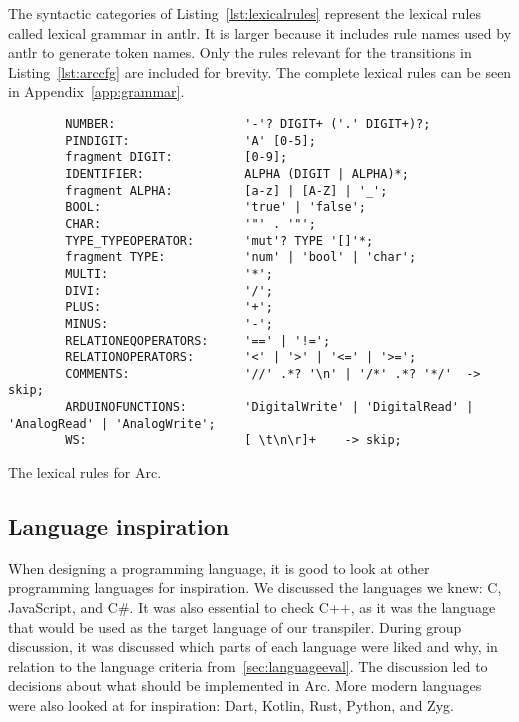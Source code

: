 The syntactic categories of Listing~\ref{lst:lexicalrules} represent the lexical rules called lexical grammar in \gls{antlr}. It is larger because it includes rule names used by \gls{antlr} to generate token names. Only the rules relevant for the transitions in Listing~\ref{lst:arccfg} are included for brevity. The complete lexical rules can be seen in Appendix~\ref{app:grammar}.


\begin{listing}[htb!]
    \begin{verbatim}
        NUMBER:                  '-'? DIGIT+ ('.' DIGIT+)?;
        PINDIGIT:                'A' [0-5];
        fragment DIGIT:          [0-9];
        IDENTIFIER:              ALPHA (DIGIT | ALPHA)*;
        fragment ALPHA:          [a-z] | [A-Z] | '_';
        BOOL:                    'true' | 'false';
        CHAR:                    '"' . '"';
        TYPE_TYPEOPERATOR:       'mut'? TYPE '[]'*;
        fragment TYPE:           'num' | 'bool' | 'char';
        MULTI:                   '*';
        DIVI:                    '/';
        PLUS:                    '+';
        MINUS:                   '-';
        RELATIONEQOPERATORS:     '==' | '!=';
        RELATIONOPERATORS:       '<' | '>' | '<=' | '>=';
        COMMENTS:                '//' .*? '\n' | '/*' .*? '*/'  -> skip;
        ARDUINOFUNCTIONS:        'DigitalWrite' | 'DigitalRead' | 'AnalogRead' | 'AnalogWrite';
        WS:                      [ \t\n\r]+    -> skip;
    \end{verbatim}
    \caption{The lexical rules for Arc.}
    \label{lst:lexicalrules}
\end{listing}


\subsection{Language inspiration}\label{sec:inspiration}
When designing a programming language, it is good to look at other programming languages for inspiration. We discussed the languages we knew: C, JavaScript, and C\#. It was also essential to check C++, as it was the language that would be used as the target language of our transpiler. During group discussion, it was discussed which parts of each language were liked and why, in relation to the language criteria from~\ref{sec:languageeval}. The discussion led to decisions about what should be implemented in Arc. More modern languages were also looked at for inspiration: Dart, Kotlin, Rust, Python, and Zyg. 

